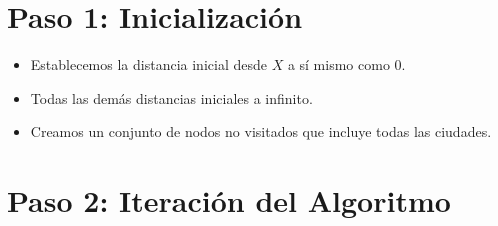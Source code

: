 \documentclass{article}
\begin{document}
\section*{Paso 1: Inicialización}

\begin{itemize}
    \item Establecemos la distancia inicial desde \( X \) a sí mismo como 0.
    \item Todas las demás distancias iniciales a infinito.
    \item Creamos un conjunto de nodos no visitados que incluye todas las ciudades.
\end{itemize}

\section*{Paso 2: Iteración del Algoritmo}
\end{document}
